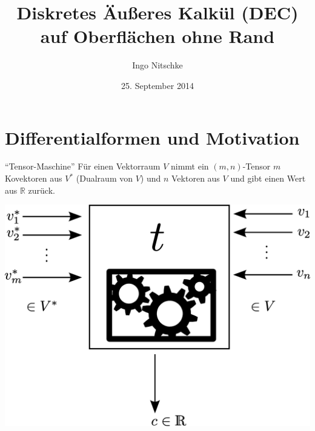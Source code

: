 \documentclass{beamer}
\title[DEC]{Diskretes Äußeres Kalkül (DEC)\\auf Oberflächen ohne Rand}
\author{Ingo Nitschke}
\institute{IWR - TU Dresden}
\date{25. September 2014}
\newcommand{\R}{\mathds{R}}
\begin{document}
 \frame{ \titlepage }

  
\section{Differentialformen und Motivation}

  \begin{frame}
    \begin{block}{"`Tensor-Maschine"'}
      Für einen Vektorraum \( V \) nimmt ein \( (m,n) \)-Tensor \( m \) Kovektoren aus \( V^{*} \)
      (Dualraum von \( V \)) und \( n \) Vektoren aus \( V \) und gibt einen Wert aus \( \R \) zurück.

      \hfill\includegraphics[height=0.7\textheight]{bilder/tensormaschine/Tensor.eps}\phantom{qwertz}
    \end{block}
  \end{frame}
\end{document}
